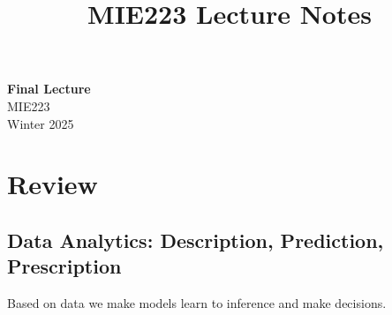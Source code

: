 \documentclass[11pt]{article}
\theoremstyle{definition}
\begin{document}
\setcounter{section}{0}
\title{MIE223 Lecture Notes}

\thispagestyle{empty}

\begin{center}
{\LARGE \bf Final Lecture}\\
{\large MIE223}\\
Winter 2025
\end{center}
\section{Review}
\subsection{Data Analytics: Description, Prediction, Prescription}
Based on data we make models learn to inference and make decisions.
\end{document}
